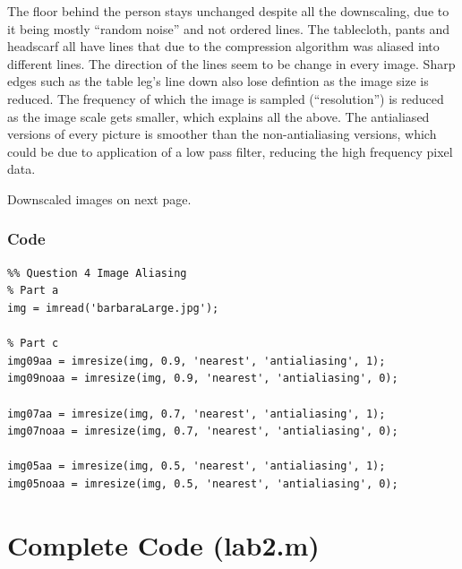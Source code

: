 \documentclass{article}
\begin{document}
The floor behind the person stays unchanged despite all the downscaling, due to it being mostly ``random noise'' and not ordered lines. The tablecloth, pants and headscarf all have lines that due to the compression algorithm was aliased into different lines. The direction of the lines seem to be change in every image. Sharp edges such as the table leg's line down also lose defintion as the image size is reduced. The frequency of which the image is sampled (``resolution'') is reduced as the image scale gets smaller, which explains all the above. The antialiased versions of every picture is smoother than the non-antialiasing versions, which could be due to application of a low pass filter, reducing the high frequency pixel data.


Downscaled images on next page.
\subsubsection{Code}
\begin{verbatim}
%% Question 4 Image Aliasing
% Part a
img = imread('barbaraLarge.jpg');

% Part c
img09aa = imresize(img, 0.9, 'nearest', 'antialiasing', 1);
img09noaa = imresize(img, 0.9, 'nearest', 'antialiasing', 0);

img07aa = imresize(img, 0.7, 'nearest', 'antialiasing', 1);
img07noaa = imresize(img, 0.7, 'nearest', 'antialiasing', 0);

img05aa = imresize(img, 0.5, 'nearest', 'antialiasing', 1);
img05noaa = imresize(img, 0.5, 'nearest', 'antialiasing', 0);
\end{verbatim}
\pagebreak
\appendix
\section{Complete Code (lab2.m)}
\inputminted{Matlab}{lab2.m}
\end{document}
